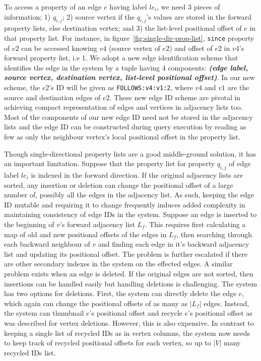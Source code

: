 To access a property of an edge $e$ having label $le_i$, we need 3 pieces of information; 1) $q_{i,j}$; 2) source vertex if the $q_{i,j}$'s values are stored in the forward property lists, else destination vertex; and 3) the list-level positional offset of $e$ in that property list. For instance, in figure~\ref{fig:single-dir-prop-list}, \texttt{since} property of $e2$ can be accessed knowing $v4$ (source vertex of $e2$) and offset of $e2$ in $v4$'s forward property list, i.e 1. We adopt a new edge identification scheme that identifies the edge in the system by a tuple having 4 components: \textbf{\emph{(edge label, source vertex, destination vertex, list-level positional offset)}}. In our new scheme, the $e2$'s ID will be given as \texttt{FOLLOWS:v4:v1:2}, where $v4$ and $v1$ are the source and destination edges of $e2$. These new edge ID scheme are pivotal in achieving compact representation of edges and vertices in adjacency lists too. Most of the components of our new edge ID need not be stored in the adjacency lists and the edge ID can be constructed during query execution by reading as few as only the neighbour vertex's local positional offset in the property list.

 Though single-directional property lists are a good middle-ground solution, it has an important limitation. Suppose that the property list for property $q_{i,j}$ of edge label $le_i$ is indexed in the forward direction. If the original adjacency lists are sorted, any insertion or deletion can change the positional offset of a large number of, possibly all the edges in the adjacency list. As such, keeping the edge ID mutable and requiring it to change frequently induces added complexity in maintaining consistency of edge IDs in the system. Suppose an edge is inserted to the beginning of $v$'s forward adjacency list $L_f$. This requires first calculating a map of old and new positional offsets of the edges in $L_f$, then searching through each backward neighbour of $v$ and finding each edge in it's backward adjacency list and updating its positional offset. The problem is further escalated if there are other secondary indexes in the system on the effected edges. A similar problem exists when an edge is deleted. If the original edges are not sorted, then insertions can be handled easily but handling deletions is challenging. The system has two options for deletions. First, the system can directly delete the edge $e$, which again can change the positional offsets of as many as $|L_f|$ edges. Instead, the system can thumbnail $e$'s positional offset and recycle $e$'s positional offset as was described for vertex deletions. However, this is also expensive. In contrast to keeping a single list of recycled IDs as in vertex columns, the system now needs to keep track of recycled positional offsets for each vertex, so up to $|V|$ many recycled IDs list.

